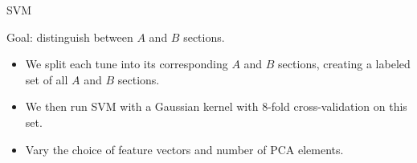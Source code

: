 \documentclass[letterpaper]{amsart}
\begin{document}
\begin{center}
\Huge
SVM
\end{center}
\huge
Goal: distinguish between $A$ and $B$ sections.

\begin{itemize}
\item We split each tune into its corresponding $A$ and $B$ sections, creating a
labeled set of all $A$ and $B$ sections.

\item We then run SVM with a Gaussian kernel with 8-fold cross-validation on
this set.

\item Vary the choice of feature vectors and number of PCA elements.
\end{itemize}

\end{document}
